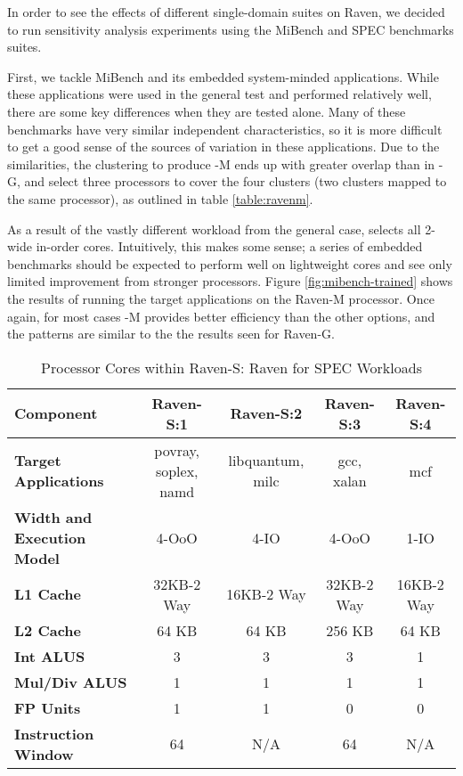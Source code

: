 In order to see the effects of different single-domain suites on
Raven, we decided to run sensitivity analysis experiments using the
MiBench and SPEC benchmarks suites.

First, we tackle MiBench and its embedded system-minded
applications. While these applications were used in the general test
and performed relatively well, there are some key differences when
they are tested alone. Many of these benchmarks have very similar
independent characteristics, so it is more difficult to get a good
sense of the sources of variation in these applications. Due to the
similarities, the clustering to produce \Ravan{}-M ends up with
greater overlap than in \Ravan{}-G, and \blackBox{} select three
processors to cover the four clusters (two clusters mapped to the same
processor), as outlined in table \ref{table:ravenm}.

As a result of the vastly different workload from the general case,
\blackBox{} selects all 2-wide in-order cores. Intuitively, this makes
some sense; a series of embedded benchmarks should be expected to
perform well on lightweight cores and see only limited improvement
from stronger processors. Figure \ref{fig:mibench-trained} shows the
results of running the target applications on the Raven-M
processor. Once again, for most cases \Ravan{}-M provides better
efficiency than the other options, and the patterns are similar to the
the results seen for Raven-G.

\begin{center}
\begin{table*}[t]
{\small
\hfill{}
\begin{tabular}{|l|c|c|c|c|}
\hline
\textbf{Component}&\textbf{Raven-S:1}&\textbf{Raven-S:2}&\textbf{Raven-S:3}&\textbf{Raven-S:4}\\
\hline
\textbf{Target Applications}&povray, soplex, namd&libquantum, milc&gcc, xalan& mcf\\
\hline
\textbf{Width and Execution Model}&4-OoO&4-IO&4-OoO&1-IO\\
\hline
\textbf{L1 Cache}&32KB-2 Way&16KB-2 Way&32KB-2 Way&16KB-2 Way\\
\hline
\textbf{L2 Cache}&64 KB&64 KB&256 KB&64 KB\\
\hline
\textbf{Int ALUS}&3&3&3&1\\
\hline
\textbf{Mul/Div ALUS}&1&1&1&1\\
\hline
\textbf{FP Units}&1&1&0&0\\
\hline
\textbf{Instruction Window}&64&N/A&64&N/A\\
\hline
\end{tabular}}
\hfill{}
\caption{Processor Cores within Raven-S: Raven for SPEC Workloads}
\label{table:ravens}
\end{table*}
\end{center}

